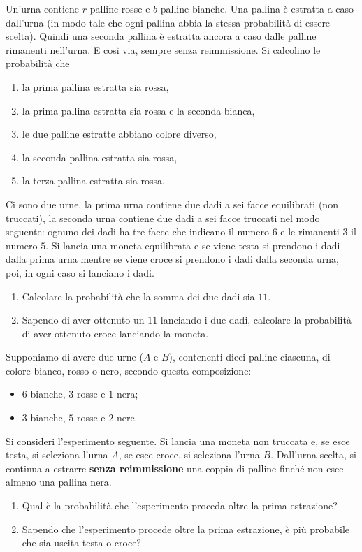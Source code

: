 Un'urna contiene $r$ palline rosse e $b$ palline bianche. Una pallina è estratta a caso dall'urna (in modo tale che ogni pallina abbia la stessa probabilità di essere scelta). Quindi una seconda pallina è estratta ancora a caso dalle palline rimanenti nell'urna. E così via, sempre senza reimmissione. Si calcolino le probabilità che
\begin{enumerate}
\item la prima pallina estratta sia rossa,
\item la prima pallina estratta sia rossa e la seconda bianca,
\item le due palline estratte abbiano colore diverso,
\item la seconda pallina estratta sia rossa,
\item la terza pallina estratta sia rossa.
\end{enumerate}
\Esercizio{}

Ci sono due urne, la prima urna contiene due dadi a sei facce equilibrati (non truccati), la seconda urna contiene due dadi a sei facce truccati nel modo seguente: ognuno dei dadi ha tre facce che indicano il numero $6$ e le rimanenti $3$ il numero $5$. Si lancia una moneta equilibrata e se viene testa si prendono i dadi dalla prima urna mentre se viene croce si prendono i dadi dalla seconda urna, poi, in ogni caso si lanciano i dadi.
\begin{enumerate}
\item Calcolare la probabilità che la somma dei due dadi sia $11$.
\item Sapendo di aver ottenuto un $11$ lanciando i due dadi, calcolare la probabilità di aver ottenuto croce lanciando la moneta.
\end{enumerate}
\Esercizio{}

Supponiamo di avere due urne ($A$ e $B$), contenenti dieci palline ciascuna, di colore bianco, rosso o nero, secondo questa composizione:
\begin{itemize}
\item $6$ bianche, $3$ rosse e $1$ nera;
\item $3$ bianche, $5$ rosse e $2$ nere.
\end{itemize}

Si consideri l'esperimento seguente. Si lancia una moneta non truccata e, se esce testa, si seleziona l'urna $A$, se esce croce, si seleziona l'urna $B$. Dall'urna scelta, si continua a estrarre \textbf{senza reimmissione} una coppia di palline finché non esce almeno una pallina nera.
\begin{enumerate}
\item Qual è la probabilità che l'esperimento proceda oltre la prima estrazione?
\item Sapendo che l'esperimento procede oltre la prima estrazione, è più probabile che sia uscita testa o croce?
\end{enumerate}

